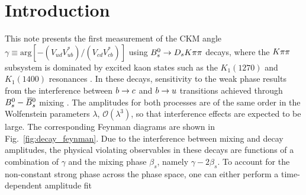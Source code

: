 
\section{Introduction}
\label{sec:Introduction}


This note presents the first measurement of the CKM angle $\gamma \equiv \text{arg}[-(V_{ud}V_{ub}^{*})/(V_{cd}V_{cb}^{*})]$ using ${{B}^0_{s}}\rightarrow{\ensuremath{{D}_{s}}}{\ensuremath{K}}\pi\pi$ decays, 
where the ${K}{\pi}{\pi}$ subsystem is dominated by excited kaon states such as the $K_{1}(1270)$ and $K_{1}(1400)$ resonances \cite{Blusk:1471393,Blusk:2012it,LHCb-PAPER-2012-033}.
In these decays, sensitivity to the weak phase results from the
interference between ${b}\rightarrow{\ensuremath{c}}$ and ${b}\rightarrow{\ensuremath{u}}$  transitions achieved through ${{B}^0_{s}}-{{\kern 0.18em\overline{\kern -0.18em B}{}}{}^0_{s}}$ mixing \cite{Fleischer:2003yb,DeBruyn:2012jp}. 
The amplitudes for both processes are of the same order in the Wolfenstein parameters $\lambda$, $\mathcal O(\lambda^3)$, so that interference
effects are expected to be large. 
The corresponding Feynman diagrams are shown in Fig.~\ref{fig:decay_feynman}.
Due to the interference between mixing and decay amplitudes, the
physical \CP violating observables in these decays are functions of a combination of $\gamma$
and the mixing phase $\beta_s$, namely $\gamma - 2\beta_s$. 
To account for the non-constant strong phase across the phase space, 
one can either perform a time-dependent amplitude fit 
